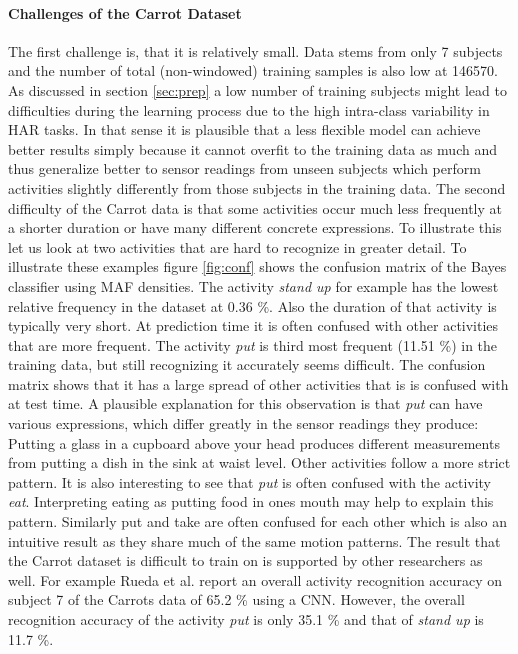 \documentclass[11pt,titlepage,oneside,openany]{book}
\begin{document}
\paragraph{Challenges of the Carrot Dataset}
The first challenge is, that it is relatively small. Data stems from only 7 subjects and the number of total (non-windowed) training samples is also low at 146570. As discussed in section \ref{sec:prep} a low number of training subjects might lead to difficulties during the learning process due to the high intra-class variability in HAR tasks. In that sense it is plausible that a less flexible model can achieve better results simply because it cannot overfit to the training data as much and thus generalize better to sensor readings from unseen subjects which perform activities slightly differently from those subjects in the training data. The second difficulty of the Carrot data is that some activities occur much less frequently at a shorter duration or have many different concrete expressions. To illustrate this let us look at two activities that are hard to recognize in greater detail. To illustrate these examples figure \ref{fig:conf} shows the confusion matrix of the Bayes classifier using MAF densities. The activity \emph{stand up} for example has the lowest relative frequency in the dataset at 0.36 \%. Also the duration of that activity is typically very short. At prediction time it is often confused with other activities that are more frequent. The activity \emph{put} is third most frequent (11.51 \%) in the training data, but still recognizing it accurately seems difficult. The confusion matrix shows that it has a large spread of other activities that is is confused with at test time. A plausible explanation for this observation is that \emph{put} can have various expressions, which differ greatly in the sensor readings they produce: Putting a glass in a cupboard above your head produces different measurements from putting a dish in the sink at waist level. Other activities follow a more strict pattern. It is also interesting to see that \emph{put} is often confused with the activity \emph{eat}. Interpreting eating as putting food in ones mouth may help to explain this pattern. Similarly put and take are often confused for each other which is also an intuitive result as they share much of the same motion patterns. The result that the Carrot dataset is difficult to train on is supported by other researchers as well. For example Rueda et al. \cite{rueda_combining_2019} report an overall activity recognition accuracy on subject 7 of the Carrots data of 65.2 \% using a CNN. However, the overall recognition accuracy of the activity \emph{put} is only 35.1 \% and that of \emph{stand up} is 11.7 \%.
\end{document}
